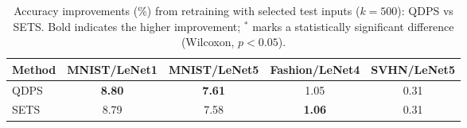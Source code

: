 \begin{table}[t]
\centering
\caption{Accuracy improvements (\%) from retraining with selected test inputs ($k=500$): QDPS vs SETS. Bold indicates the higher improvement; $^{*}$ marks a statistically significant difference (Wilcoxon, $p<0.05$).}
\label{tab:retrain_qdps_vs_sets}
\begin{tabular}{l|cccc}
\toprule
Method & MNIST/LeNet1 & MNIST/LeNet5 & Fashion/LeNet4 & SVHN/LeNet5 \\
\midrule
QDPS & \textbf{8.80} & \textbf{7.61} & 1.05 & 0.31 \\
SETS & 8.79 & 7.58 & \textbf{1.06} & 0.31 \\
\bottomrule
\end{tabular}
\end{table}
